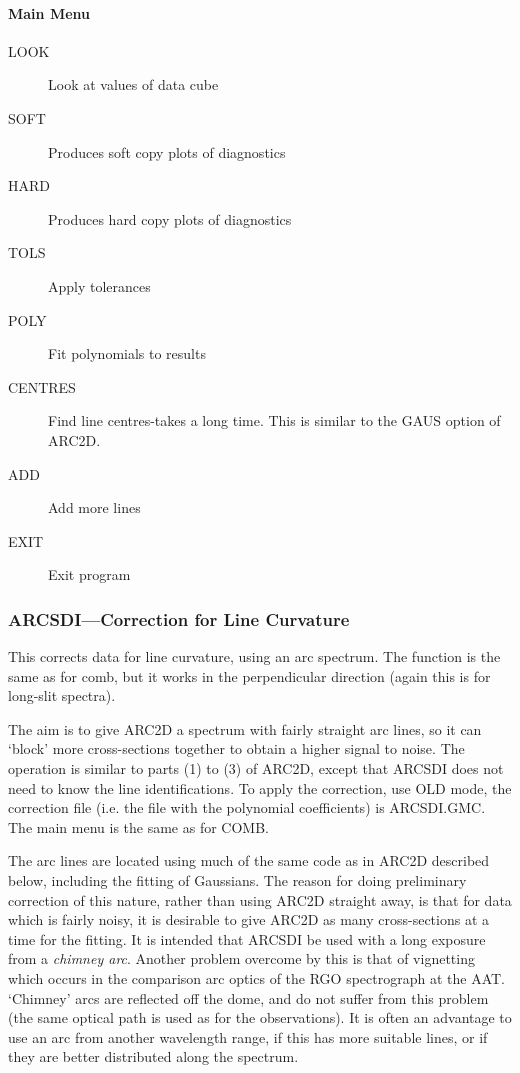 \paragraph{Main Menu}

\begin{description}
\item[LOOK] Look at values of data cube
\item[SOFT] Produces soft copy plots of diagnostics
\item[HARD] Produces hard copy plots of diagnostics
\item[TOLS] Apply tolerances
\item[POLY] Fit polynomials to results
\item[CENTRES] Find line centres-takes a long time.
This is similar to the GAUS option of ARC2D.
\item[ADD] Add more lines
\item[EXIT] Exit program
\end{description}

\subsubsection{%
ARCSDI---Correction for Line Curvature}

This corrects data for line curvature, using an arc spectrum.
The function is the same as for comb, but it works in the perpendicular
direction (again this is for long-slit spectra).

The aim is to give ARC2D a spectrum with fairly straight arc lines, so
it can `block' more cross-sections together to obtain a higher signal
to noise.
The operation is similar to parts (1) to (3) of ARC2D, except that
ARCSDI does not need to know the line identifications.
To apply the correction, use OLD mode, the correction file (i.e. the
file with the polynomial coefficients) is ARCSDI.GMC.
The main menu is the same as for COMB.

The arc lines are located using much of the same code as in ARC2D
described below, including the fitting of Gaussians. The reason for
doing preliminary correction of this nature, rather than using ARC2D
straight away, is that for data which is fairly noisy, it is desirable
to give ARC2D as many cross-sections at a time for the fitting. It is
intended that ARCSDI be used with a long exposure from a {\em chimney
arc}. Another problem overcome by this is that of vignetting which
occurs in the comparison arc optics of the RGO spectrograph at the
AAT\@. `Chimney' arcs are reflected off the dome, and do not suffer
from this problem (the same optical path is used as for the
observations). It is often an advantage to use an arc from another
wavelength range, if this has more suitable lines, or if they are
better distributed along the spectrum.

